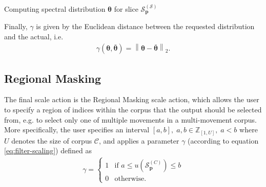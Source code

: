 \begin{algorithm}[h!]	
			\caption{Computing spectral distribution $\bm\theta$ for slice $\mathcal S^{(\mathcal S)}_{\bm p}$}
			\begin{spacing}{1.2}
			\begin{algorithmic}\label{alg:spectraldist}
				\ENDFOR
			\end{algorithmic}
			\end{spacing}
		\end{algorithm}
		
\noindent Finally, $\gamma$ is given by the Euclidean distance between the requested distribution and the actual, i.e.
	\begin{align}
		\gamma\left(\bm \theta, \bm{\bar \theta}\right) = \left\lVert \bm\theta - \bm{\bar \theta}\right\rVert_2.
	\end{align}


	


\subsection{Regional Masking}
The final scale action is the Regional Masking scale action, which allows the user to specify a region of indices within the corpus that the output should be selected from, e.g. to select only one of multiple movements in a multi-movement corpus. More specifically, the user specifies an interval $[a, b],\; a,b \in \mathbb Z_{[1,U]},\; a < b$ where $U$ denotes the size of corpus $\mathcal C$, and applies a parameter $\gamma$ (according to equation \ref{eq:filter-scaling}) defined as
	\begin{align}
		\gamma = \left\lbrace\begin{array}{ll}
			1 & \text{if } a \le u\left(\mathcal S^{(C)}_{\bm p}\right) \le b \\
			0 & \text{otherwise}.
		\end{array}\right.
	\end{align}

